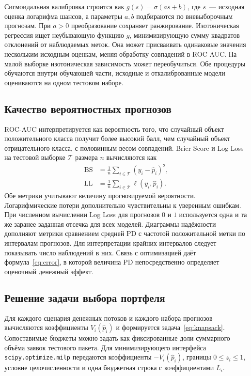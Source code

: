 \documentclass{misisarticle}
\begin{document}
Сигмоидальная калибровка строится как $g(s)=\sigma(as+b)$, где $s$~--- исходная оценка логарифма шансов, а параметры $a,b$ подбираются по вневыборочным прогнозам. При $a>0$ преобразование сохраняет ранжирование. Изотоническая регрессия ищет неубывающую функцию $g$, минимизирующую сумму квадратов отклонений от наблюдаемых меток. Она может присваивать одинаковые значения нескольким исходным оценкам, меняя обработку совпадений в ROC-AUC. На малой выборке изотоническая зависимость может переобучиться. Обе процедуры обучаются внутри обучающей части, исходные и откалиброванные модели оцениваются на одном тестовом наборе.

\subsection{Качество вероятностных прогнозов}

ROC-AUC интерпретируется как вероятность того, что случайный объект положительного класса получит более высокий балл, чем случайный объект отрицательного класса, с половинным весом совпадений. Brier Score и Log Loss на тестовой выборке $\mathcal T$ размера $n$ вычисляются как
\begin{align}
  \mathrm{BS} &= \frac{1}{n}\sum_{i\in\mathcal T}(y_i-\hat p_i)^2,\\
  \mathrm{LL} &= \frac{1}{n}\sum_{i\in\mathcal T}\ell(y_i,\hat p_i).
\end{align}
Обе метрики учитывают величину прогнозируемой вероятности. Логарифмические потери дополнительно чувствительны к уверенным ошибкам. При численном вычислении Log Loss для прогнозов $0$ и $1$ используется одна и та же заранее заданная отсечка для всех моделей. Диаграммы надёжности дополняют метрики сравнением средней PD с частотой положительной метки по интервалам прогнозов. Для интерпретации крайних интервалов следует показывать число наблюдений в них. Связь с оптимизацией даёт формула~\eqref{eq:error}, в которой величина PD непосредственно определяет оценочный денежный эффект.

\subsection{Решение задачи выбора портфеля}

Для каждого сценария денежных потоков и каждого набора прогнозов вычисляются коэффициенты $V_i(\hat p_i)$ и формируется задача~\eqref{eq:knapsack}. Сопоставимые бюджеты можно задать как фиксированные доли суммарного объёма заявок тестового пакета. Для минимизирующего интерфейса \texttt{scipy.optimize.milp} передаются коэффициенты $-V_i(\hat p_i)$, границы $0\le z_i\le 1$, условие целочисленности и одна бюджетная строка с коэффициентами $L_i$.
\end{document}
